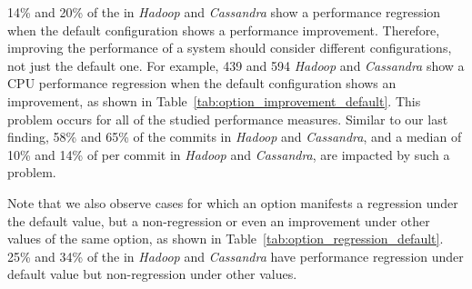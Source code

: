 
14\% and 20\% of the \instance in \emph{Hadoop} and \emph{Cassandra} show a performance regression when the default configuration shows a performance improvement. Therefore, improving the performance of a system should consider different configurations, not just the default one. For example, 439 and 594 \emph{Hadoop} and \emph{Cassandra} \instance show a CPU performance regression when the default configuration shows an improvement, as shown in Table~\ref{tab:option_improvement_default}. This problem occurs for all of the studied performance measures. Similar to our last finding, 58\% and 65\% of the commits in \emph{Hadoop} and \emph{Cassandra}, and a median of 10\% and 14\% of \instance per commit in \emph{Hadoop} and \emph{Cassandra}, are impacted by such a problem.

Note that we also observe cases for which an option manifests a regression under the default value, but a non-regression or even an improvement under other values of the same option, as shown in Table~\ref{tab:option_regression_default}. 25\% and 34\% of the \instance in \emph{Hadoop} and \emph{Cassandra} have performance regression under default value but non-regression under other values. %




